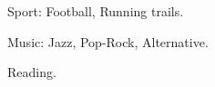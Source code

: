 
\begin{cventries}

      \begin{cvitems} %
        \item {Sport: Football, Running trails.}
        \item {Music: Jazz, Pop-Rock, Alternative.}
        \item {Reading.}
	\newline
      \end{cvitems}

\end{cventries}
